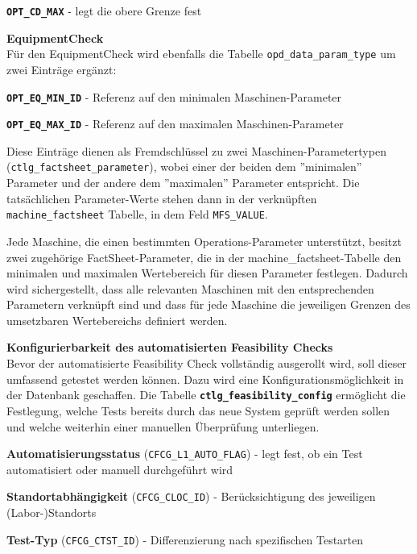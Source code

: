 \textbf{\texttt{OPT\_CD\_MAX}} - legt die obere Grenze fest

\setlength{\leftskip}{0em} 

\textbf{\gls{EquipmentCheck}} \\
Für den \gls{EquipmentCheck} wird ebenfalls die Tabelle \texttt{opd\_data\_param\_type} um zwei Einträge ergänzt:

\setlength{\leftskip}{1em} 
\textbf{\texttt{OPT\_EQ\_MIN\_ID}} - Referenz auf den minimalen Maschinen-Parameter

\textbf{\texttt{OPT\_EQ\_MAX\_ID}} - Referenz auf den maximalen Maschinen-Parameter

\setlength{\leftskip}{0em} 

Diese Einträge dienen als Fremdschlüssel zu zwei Maschinen-Parametertypen (\texttt{ctlg\_factsheet\_parameter}), wobei einer der beiden dem ''minimalen'' Parameter und der andere dem ''maximalen'' Parameter entspricht. Die tatsächlichen Parameter-Werte stehen dann in der verknüpften \texttt{machine\_factsheet} Tabelle, in dem Feld \texttt{MFS\_VALUE}.

Jede Maschine, die einen bestimmten Operations-Parameter unterstützt, besitzt zwei zugehörige FactSheet-Parameter, die in der machine\_factsheet-Tabelle den minimalen und maximalen Wertebereich für diesen Parameter festlegen. Dadurch wird sichergestellt, dass alle relevanten Maschinen mit den entsprechenden Parametern verknüpft sind und dass für jede Maschine die jeweiligen Grenzen des umsetzbaren Wertebereichs definiert werden.


\textbf{Konfigurierbarkeit des automatisierten Feasibility Checks} \\
Bevor der automatisierte Feasibility Check vollständig ausgerollt wird, soll dieser umfassend getestet werden können. Dazu wird eine Konfigurationsmöglichkeit in der Datenbank geschaffen. Die Tabelle \textbf{\texttt{ctlg\_feasibility\_config}} ermöglicht die Festlegung, welche Tests bereits durch das neue System geprüft werden sollen und welche weiterhin einer manuellen Überprüfung unterliegen.

\setlength{\leftskip}{1em}

\textbf{Automatisierungsstatus} (\texttt{CFCG\_L1\_AUTO\_FLAG}) - legt fest, ob ein Test automatisiert oder manuell durchgeführt wird

\textbf{Standortabhängigkeit} (\texttt{CFCG\_CLOC\_ID}) - Berücksichtigung des jeweiligen (Labor-)Standorts

\textbf{Test-Typ} (\texttt{CFCG\_CTST\_ID}) - Differenzierung nach spezifischen Testarten

